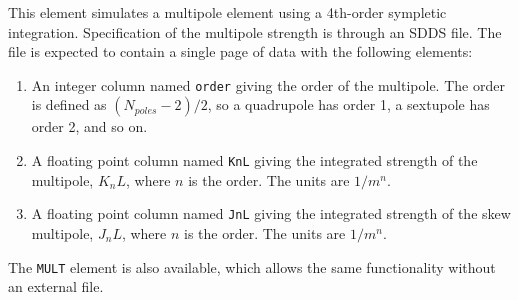 \begin{raggedright}
This element simulates a multipole element using a 4th-order sympletic
integration.  
Specification of the multipole strength is through an SDDS file.
The file is expected to contain a single page of
data with the following elements:
\end{raggedright}
\begin{enumerate}
\item An integer column named {\tt order} giving the order of the multipole.
The order is defined as $(N_{poles}-2)/2$, so a quadrupole has order 1, a
sextupole has order 2, and so on.
\item A floating point column named {\tt KnL} giving the integrated strength of
the multipole, $K_n L$, where $n$ is the order.  The units are $1/m^n$.
\item A floating point column named {\tt JnL} giving the integrated strength of
the skew multipole, $J_n L$, where $n$ is the order.  The units are $1/m^n$.
\end{enumerate}

The {\tt MULT} element is also available, which allows the same
functionality without an external file.
